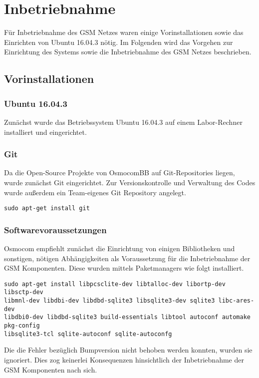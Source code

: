
\section{Inbetriebnahme}
Für Inbetriebnahme des GSM Netzes waren einige Vorinstallationen sowie das Einrichten von Ubuntu 16.04.3 nötig. Im Folgenden wird das Vorgehen zur Einrichtung des Systems sowie die Inbetriebnahme des GSM Netzes beschrieben.

\subsection{Vorinstallationen}

\subsubsection{Ubuntu 16.04.3}
Zunächst wurde das Betriebssystem Ubuntu 16.04.3 auf einem Labor-Rechner installiert und eingerichtet.

\subsubsection{Git}
Da die Open-Source Projekte von OsmocomBB auf Git-Repositories liegen, wurde zunächst Git eingerichtet. Zur Versionskontrolle und Verwaltung des Codes wurde außerdem ein Team-eigenes Git Repository angelegt.

\begin{lstlisting}
sudo apt-get install git
\end{lstlisting}

\subsubsection{Softwarevoraussetzungen}
Osmocom empfiehlt zunächst die Einrichtung von einigen Bibliotheken und sonstigen, nötigen Abhängigkeiten als Voraussetzung für die Inbetriebnahme der GSM Komponenten. Diese wurden mittels Paketmanagers wie folgt installiert.

\begin{lstlisting}
sudo apt-get install libpcsclite-dev libtalloc-dev libortp-dev libsctp-dev 
libmnl-dev libdbi-dev libdbd-sqlite3 libsqlite3-dev sqlite3 libc-ares-dev 
libdbi0-dev libdbd-sqlite3 build-essentials libtool autoconf automake pkg-config 
libsqlite3-tcl sqlite-autoconf sqlite-autoconfg
\end{lstlisting}

Die die Fehler bezüglich Bumpversion nicht behoben werden konnten, wurden sie ignoriert. Dies zog keinerlei Konsequenzen hinsichtlich der Inbetriebnahme der GSM Komponenten nach sich.

